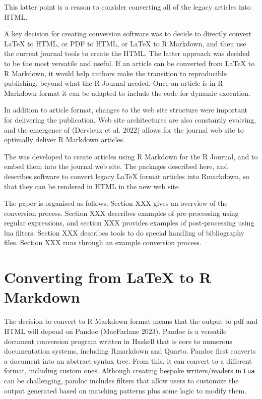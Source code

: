 This latter point is a reason to consider converting all of the legacy articles into HTML.

A key decision for creating conversion software was to decide to directly convert LaTeX to HTML, or PDF to HTML, or LaTeX to R Markdown, and then use the current journal tools to create the HTML. The latter approach was decided to be the most versatile and useful. If an article can be converted from LaTeX to R Markdown, it would help authors make the transition to reproducible publishing, beyond what the R Journal needed. Once an article is in R Markdown format it can be adapted to include the code for dynamic execution.

In addition to article format, changes to the web site structure were important for delivering the publication. Web site architectures are also constantly evolving, and the emergence of  (Dervieux et al. 2022) allows for the journal web site to optimally deliver R Markdown articles.

The  was developed to create articles using R Markdown for the R Journal, and to embed them into the journal web site. The packages described here,  and  describes software to convert legacy LaTeX format articles into Rmarkdown, so that they can be rendered in HTML in the new web site.

The paper is organised as follows. Section XXX gives an overview of the conversion process. Section XXX describes examples of pre-processing using regular expressions, and section XXX provides examples of post-processing using lua filters. Section XXX describes tools to do special handling of bibliography files. Section XXX runs through an example conversion process.

\hypertarget{converting-from-latex-to-r-markdown}{%
\section{Converting from LaTeX to R Markdown}\label{converting-from-latex-to-r-markdown}}

The decision to convert to R Markdown format means that the output to pdf and HTML will depend on Pandoc (MacFarlane 2023).
Pandoc is a versatile document conversion program written in Haskell that is core to numerous documentation systems, including Rmarkdown and Quarto. Pandoc first converts a document into an abstract syntax tree. From this, it can convert to a different format, including custom ones. Although creating bespoke writers/readers in \texttt{Lua} can be challenging, pandoc includes filters that allow users to customize the output generated based on matching patterns plus some logic to modify them.

